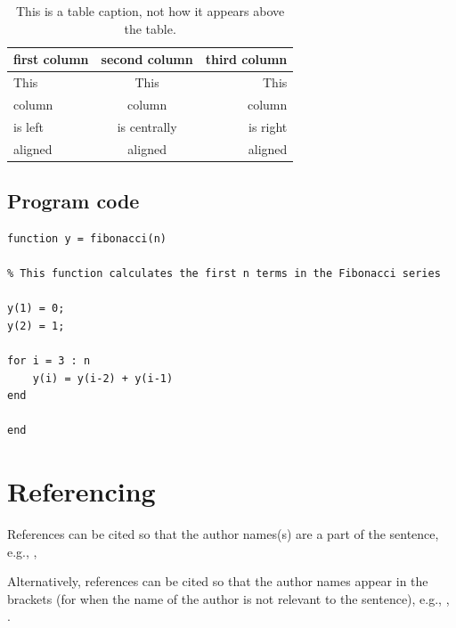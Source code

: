 \documentclass[11pt, a4paper]{report}
\begin{document}
\begin{table}[H]
  \caption{This is a table caption, not how it appears above the table.}
  \label{tab:table label} %
  \begin{center}
    \begin{tabular}{lcr} %
      \toprule %
      first column & second column & third column \\
      \midrule %
      This & This & This \\
      column & column & column \\
      is left & is centrally & is right \\
      aligned & aligned & aligned \\
      \bottomrule %
    \end{tabular}
  \end{center}
\end{table}

\subsection{Program code}

\begin{lstlisting}[style=matlabcode,
    caption = A MATLAB function to compute the first $n$ numbers of the Fibonacci series,
    label = mat:fibonacci
    ]
function y = fibonacci(n)

% This function calculates the first n terms in the Fibonacci series

y(1) = 0;
y(2) = 1;

for i = 3 : n
    y(i) = y(i-2) + y(i-1)
end

end
\end{lstlisting}

\section{Referencing}
References can be cited so that the author names(s) are a part of the sentence, e.g., \textcite{stroud:2013}, \textcite{harten:1983}

Alternatively, references can be cited so that the author names appear in the brackets (for when the name of the author is not relevant to the sentence), e.g., \parencite{stroud:2013},  \parencite{harten:1983}.
\end{document}
